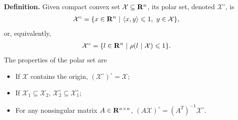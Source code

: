 \documentclass[letterpaper,10pt,english]{sphinxmanual}
\begin{document}
\textbf{Definition.} Given compact convex set \({\mathcal X}\subseteq{\bf R}^n\), its polar
set, denoted \({\mathcal X}^\circ\), is
\begin{gather}
\begin{split}{\mathcal X}^\circ = \{x\in{\bf R}^n ~|~ \langle x,y\rangle\leqslant1, ~ y\in{\mathcal X}\},\end{split}\notag
\end{gather}
or, equivalently,
\begin{gather}
\begin{split}{\mathcal X}^\circ = \{l\in{\bf R}^n ~|~ \rho(l ~|~ {\mathcal X})\leqslant1\}.\end{split}\notag
\end{gather}
The properties of the polar set are
\begin{itemize}
\item {} 
If \({\mathcal X}\) contains the origin,
\(({\mathcal X}^\circ)^\circ = {\mathcal X}\);

\item {} 
If \({\mathcal X}_1\subseteq{\mathcal X}_2\),
\({\mathcal X}_2^\circ\subseteq{\mathcal X}_1^\circ\);

\item {} 
For any nonsingular matrix \(A\in{\bf R}^{n\times n}\),
\((A{\mathcal X})^\circ = (A^T)^{-1}{\mathcal X}^\circ\).

\end{itemize}
\end{document}
